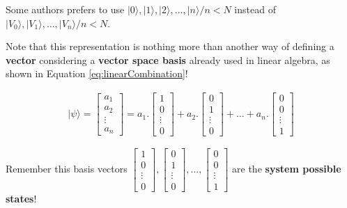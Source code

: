 			\par Some authors prefers to use $|0\rangle, |1\rangle, |2\rangle, \dots , |n\rangle / n < N$ instead of $|V_0\rangle,|V_1\rangle, \dots, |V_n\rangle / n < N$.\newline

			\par Note that this representation is nothing more than another way of defining a \textbf{vector} considering a \textbf{vector space basis} already used in linear algebra, as shown in Equation \ref{eq:linearCombination}!\newline
			
			\begin{equation}
				\label{eq:linearCombination}
				\begin{aligned}
					|\psi\rangle =
					\begin{bmatrix}
						a_{1} \\
						a_{2} \\
						\vdots \\
						a_{n}
					\end{bmatrix} =
					a_1 . \begin{bmatrix}
						1\\
						0\\
						\vdots \\
						0
					\end{bmatrix}+
					a_2 . \begin{bmatrix}
						0\\
						1\\
						\vdots \\
						0
					\end{bmatrix}+
					\dots + a_n . \begin{bmatrix}
						0\\
						0\\
						\vdots \\
						1
					\end{bmatrix}
				\end{aligned}
			\end{equation}
		
			\par Remember this basis vectors $
			\begin{bmatrix}
				1\\
				0\\
				\vdots \\
				0
			\end{bmatrix}, 
			\begin{bmatrix}
				0\\
				1\\
				\vdots \\
				0
			\end{bmatrix}, \dots,
			\begin{bmatrix}
				0\\
				0\\
				\vdots \\
				1
			\end{bmatrix}$ are the \textbf{system possible states}!
		
